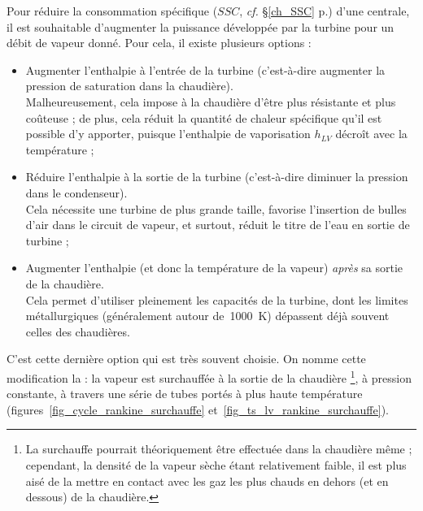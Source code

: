		Pour réduire la consommation spécifique ($SSC$, \textit{cf.} \S\ref{ch_SSC} p.\pageref{ch_SSC}) d’une centrale, il est souhaitable d’augmenter la puissance développée par la turbine pour un débit de vapeur donné. Pour cela, il existe plusieurs options :

		\begin{itemize}
			\item Augmenter l’enthalpie à l’entrée de la turbine (c’est-à-dire augmenter la pression de saturation dans la chaudière). \\
			Malheureusement, cela impose à la chaudière d’être plus résistante et plus coûteuse ; de plus, cela réduit la quantité de chaleur spécifique qu’il est possible d’y apporter, puisque l’enthalpie de vaporisation $h_{LV}$ décroît avec la température ;

			\item Réduire l’enthalpie à la sortie de la turbine (c’est-à-dire diminuer la pression dans le condenseur). \\
			Cela nécessite une turbine de plus grande taille,  favorise l’insertion de bulles d’air dans le circuit de vapeur, et surtout, réduit le titre de l’eau en sortie de turbine ;

			\item Augmenter l’enthalpie (et donc la température de la vapeur) \emph{après} sa sortie de la chaudière.\\
			Cela permet d’utiliser pleinement les capacités de la turbine, dont les limites métallurgiques (généralement autour de~\SI{1000}{\kelvin}) dépassent déjà souvent celles des chaudières.
		\end{itemize}

		C’est cette dernière option qui est très souvent choisie. On nomme cette modification la  : la vapeur est surchauffée à la sortie de la chaudière%
		\footnote{La surchauffe pourrait théoriquement être effectuée dans la chaudière même ; cependant, la densité de la vapeur sèche étant relativement faible, il est plus aisé de la mettre en contact avec les gaz les plus chauds en dehors (et en dessous) de la chaudière.}, à pression constante, à travers une série de tubes portés à plus haute température (figures~\ref{fig_cycle_rankine_surchauffe} et~\ref{fig_ts_lv_rankine_surchauffe}).

